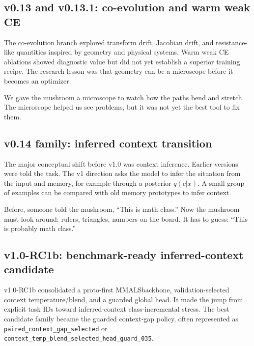 \documentclass[11pt]{article}
\newcommand{\mmals}{\textsc{MMALS}}
\begin{document}
\subsection{v0.13 and v0.13.1: co-evolution and warm weak CE}

The co-evolution branch explored transform drift, Jacobian drift, and resistance-like quantities inspired by geometry and physical systems. Warm weak CE ablations showed diagnostic value but did not yet establish a superior training recipe. The research lesson was that geometry can be a microscope before it becomes an optimizer.

\begin{kidbox}
We gave the mushroom a microscope to watch how the paths bend and stretch. The microscope helped us see problems, but it was not yet the best tool to fix them.
\end{kidbox}

\subsection{v0.14 family: inferred context transition}

The major conceptual shift before v1.0 was context inference. Earlier versions were told the task. The v1 direction asks the model to infer the situation from the input and memory, for example through a posterior $q(c|x)$. A small group of examples can be compared with old memory prototypes to infer context.

\begin{kidbox}
Before, someone told the mushroom, ``This is math class.'' Now the mushroom must look around: rulers, triangles, numbers on the board. It has to guess: ``This is probably math class.''
\end{kidbox}

\subsection{v1.0-RC1b: benchmark-ready inferred-context candidate}

v1.0-RC1b consolidated a proto-first \mmals backbone, validation-selected context temperature/blend, and a guarded global head. It made the jump from explicit task IDs toward inferred-context class-incremental stress. The best candidate family became the guarded context-gap policy, often represented as \texttt{paired\_context\_gap\_selected} or \texttt{context\_temp\_blend\_selected\_head\_guard\_035}.
\end{document}
